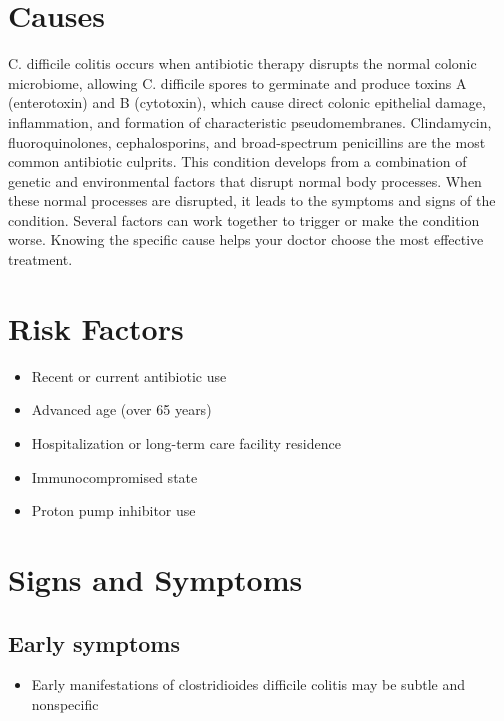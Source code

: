\section{Causes}
C. difficile colitis occurs when antibiotic therapy disrupts the normal colonic microbiome, allowing C. difficile spores to germinate and produce toxins A (enterotoxin) and B (cytotoxin), which cause direct colonic epithelial damage, inflammation, and formation of characteristic pseudomembranes. Clindamycin, fluoroquinolones, cephalosporins, and broad-spectrum penicillins are the most common antibiotic culprits. This condition develops from a combination of genetic and environmental factors that disrupt normal body processes. When these normal processes are disrupted, it leads to the symptoms and signs of the condition. Several factors can work together to trigger or make the condition worse. Knowing the specific cause helps your doctor choose the most effective treatment.

\section{Risk Factors}

\begin{itemize}[noitemsep]
  \item Recent or current antibiotic use
  \item Advanced age (over 65 years)
  \item Hospitalization or long-term care facility residence
  \item Immunocompromised state
  \item Proton pump inhibitor use
\end{itemize}

\section{Signs and Symptoms}

\subsection{Early symptoms}
\begin{itemize}[noitemsep]
  \item Early manifestations of clostridioides difficile colitis may be subtle and nonspecific
\end{itemize}

